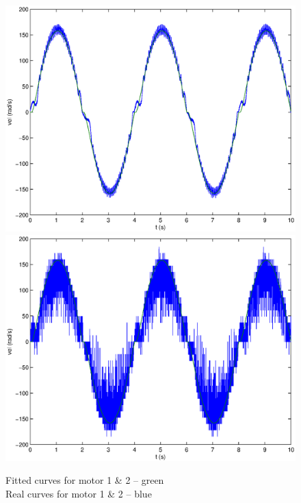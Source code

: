 \begin{center}
\begin{figure}[ht]
 \includegraphics[width=\linewidth]{fig/motor1L2_2.eps}
 \includegraphics[width=\linewidth]{fig/motor2L2_2.eps}
 \caption{Fitted curves for motor 1 \& 2 -- green \\ Real curves for motor 1 \& 2 -- blue}
 \label{fittedCurves2}
\end{figure}
\end{center}

